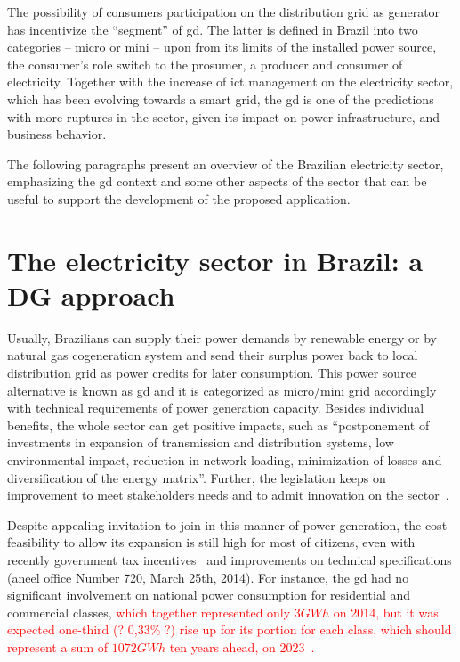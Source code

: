 The possibility of consumers participation on the distribution grid as generator has incentivize the ``segment'' of \gls{gd}.
The latter is defined in Brazil into two categories -- micro or mini -- upon from its limits of the installed power source,
the consumer's role switch to the prosumer, a producer and consumer of electricity.
Together with the increase of \gls{ict} management on the electricity sector, which has been evolving towards a smart grid,
the \gls{gd} is one of the predictions with more ruptures in the sector, given its impact on power infrastructure, and business behavior.

The following paragraphs present an overview of the Brazilian electricity sector, emphasizing the \gls{gd} context and some other aspects of the sector that can be useful to support the development of the proposed application.

\section{The electricity sector in Brazil: a DG approach~\label{sec:brazil-sector}}

Usually, Brazilians can supply their power demands by renewable energy or by natural gas cogeneration system and send their surplus power back to local distribution grid as power credits for later consumption.
This power source alternative is known as \gls{gd} and it is categorized as micro/mini grid accordingly with technical requirements of power generation capacity.
Besides individual benefits, the whole sector can get positive impacts, such as ``postponement of investments in expansion of transmission and distribution systems, low environmental impact, reduction in network loading, minimization of losses and diversification of the energy matrix''.
Further, the legislation keeps on improvement to meet stakeholders needs and to admit innovation on the sector~\cite{GD}.

Despite appealing invitation to join in this manner of power generation, the cost feasibility to allow its expansion is still high for most of citizens, even with recently government tax incentives~\cite{ideal2017} and improvements on technical specifications (\gls{aneel} office Number 720, March 25th, 2014).
For instance, the \gls{gd} had no significant involvement on national power consumption for residential and commercial classes,
\textcolor{red}{which together represented only $3 GWh$ on 2014, but it was expected one-third (? 0,33\% ?) rise up for its portion for each class, which should represent a sum of $1072 GWh$ ten years ahead, on 2023~\cite{epe2014}.}

